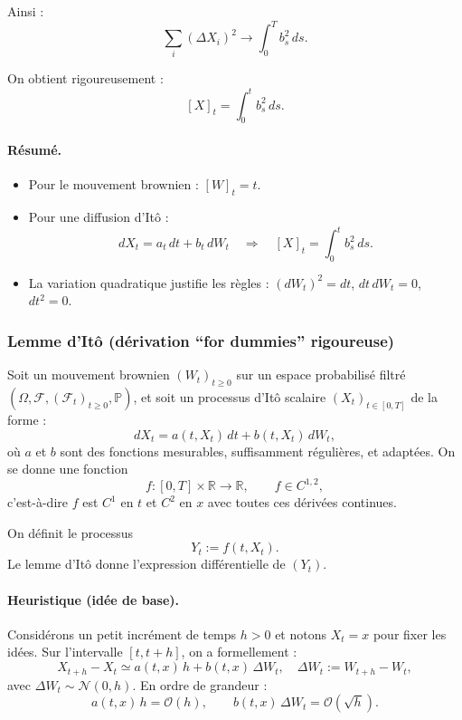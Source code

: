 \documentclass[11pt,a4paper]{article}
\newcommand{\1}{\mathbf{1}}
\begin{document}
Ainsi :
\[
\sum_i (\Delta X_i)^2
\to \int_0^T b_s^2\, ds.
\]

On obtient rigoureusement :
\[
[X]_t = \int_0^t b_s^2\, ds.
\]

\paragraph{Résumé.}
\begin{itemize}
  \item Pour le mouvement brownien : $[W]_t = t$.
  \item Pour une diffusion d'It\^{o} :
  \[
  dX_t = a_t\,dt + b_t\,dW_t
  \quad\Rightarrow\quad
  [X]_t = \int_0^t b_s^2\, ds.
  \]
  \item La variation quadratique justifie les règles :
  $(dW_t)^2 = dt$, $dt\,dW_t = 0$, $dt^2 = 0$.
\end{itemize}


\subsubsection{Lemme d'It\^{o} (d\'erivation ``for dummies'' rigoureuse)}

\bigskip

Soit un mouvement brownien $(W_t)_{t\ge 0}$ sur un espace probabilis\'e
filtr\'e $(\Omega,\mathcal{F},(\mathcal{F}_t)_{t\ge 0},\mathbb{P})$, et soit
un processus d'It\^{o} scalaire $(X_t)_{t\in[0,T]}$ de la forme :
\[
dX_t = a(t,X_t)\,dt + b(t,X_t)\,dW_t,
\]
o\`u $a$ et $b$ sont des fonctions mesurables, suffisamment r\'eguli\`eres, et
adapt\'ees. On se donne une fonction
\[
f : [0,T]\times \mathbb{R} \to \mathbb{R},
\qquad f \in C^{1,2},
\]
c'est-\`a-dire $f$ est $C^1$ en $t$ et $C^2$ en $x$ avec toutes ces d\'eriv\'ees
continues.

On d\'efinit le processus
\[
Y_t := f(t,X_t).
\]
Le lemme d'It\^{o} donne l'expression diff\'erentielle de $(Y_t)$.

\paragraph{Heuristique (id\'ee de base).}

Consid\'erons un petit incr\'ement de temps $h>0$ et notons $X_t = x$ pour fixer les id\'ees.
Sur l'intervalle $[t,t+h]$, on a formellement :
\[
X_{t+h} - X_t
\simeq a(t,x)\,h + b(t,x)\,\Delta W_t,
\quad
\Delta W_t := W_{t+h} - W_t,
\]
avec $\Delta W_t \sim \mathcal{N}(0,h)$. En ordre de grandeur :
\[
a(t,x)\,h = \mathcal{O}(h),
\qquad
b(t,x)\,\Delta W_t = \mathcal{O}(\sqrt{h}).
\]
\end{document}
